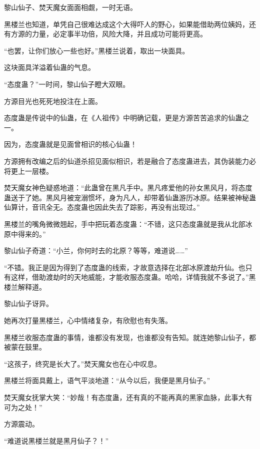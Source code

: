 \begin{this_body}
黎山仙子、焚天魔女面面相觑，一时无语。

黑楼兰也知道，单凭自己很难达成这个大得吓人的野心，如果能借助两位姨妈，还有方源的力量，必定事半功倍，风险大降，并且成功可能将更高。

“也罢，让你们放心一些也好。”黑楼兰说着，取出一块面具。

这块面具洋溢着仙蛊的气息。

“态度蛊？”一时间，黎山仙子瞪大双眼。

方源目光也死死地投注在上面。

态度蛊是传说中的仙蛊，在《人祖传》中明确记载，更是方源苦苦追求的仙蛊之一。

因为，态度蛊就是见面曾相识的核心仙蛊！

方源拥有改编之后的仙道杀招见面似相识，若是融合了态度蛊进去，其伪装能力必将更上一层楼。

焚天魔女神色疑惑地道：“此蛊曾在黑凡手中。黑凡疼爱他的孙女黑风月，将态度蛊送于了她。黑风月被宠溺惯坏，身为凡人，却带着仙蛊游历冰原。结果被神秘蛊仙算计，音讯全无。态度蛊也因此失去了踪影，再没有出现过。”

黑楼兰的嘴角微微翘起，手中把玩着态度蛊：“不错，这只态度蛊就是我从北部冰原中得来的。”

黎山仙子奇道：“小兰，你何时去的北原？等等，难道说……”

“不错。我正是因为得到了态度蛊的线索，才故意选择在北部冰原渡劫升仙。也只有这样，借助渡劫时的天地威能，才能收服态度蛊。哈哈，详情我就不多说了。”黑楼兰解释道。

黎山仙子讶异。

她再次打量黑楼兰，心中情绪复杂，有欣慰也有失落。

黑楼兰收服态度蛊的事情，谁都没有发现，也谁都没有告知。就连她黎山仙子，都被蒙在鼓里。

“这孩子，终究是长大了。”焚天魔女也在心中叹息。

黑楼兰将面具戴上，语气平淡地道：“从今以后，我便是黑月仙子。”

焚天魔女抚掌大笑：“妙哉！有态度蛊，还有真的不能再真的黑家血脉，此事大有可为之处！”

方源震动。

“难道说黑楼兰就是黑月仙子？！”

\end{this_body}

